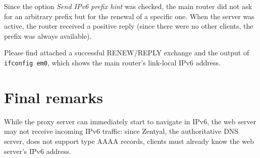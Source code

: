 \documentclass[draft]{homework}
\newcommand{\ip}{IPv6\xspace}
\begin{document}
    Since the option \textit{Send \ip prefix hint} was checked, the main router did not ask for an arbitrary prefix but for the renewal of a specific one.
    When the server was active, the router received a positive reply (since there were no other clients, the prefix was always available).
    
    Please find attached a successful RENEW/REPLY exchange and the output of \texttt{ifconfig em0}, which shows the main router's link-local \ip address.
    
    
    \section{Final remarks}
    While the proxy server can immediately start to navigate in \ip, the web server may not receive incoming \ip traffic: since Zentyal, the authoritative DNS server, does not support type AAAA records, clients must already know the web server's \ip address.
\end{document}
